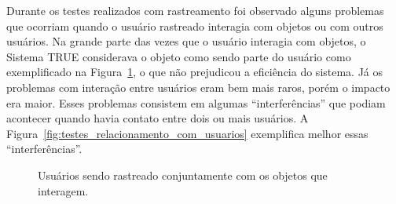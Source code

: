 	Durante os testes realizados com rastreamento foi observado alguns problemas que ocorriam quando o usuário rastreado interagia com objetos ou com outros usuários. Na grande parte das vezes que o usuário interagia com objetos, o Sistema TRUE considerava o objeto como sendo parte do usuário como exemplificado na Figura~\ref{fig:testes_relacionamento_com_objetos}, o que não prejudicou a eficiência do sistema. Já os problemas com interação entre usuários eram bem mais raros, porém o impacto era maior. Esses problemas consistem em algumas ``interferências'' que podiam acontecer quando havia contato entre dois ou mais usuários. A Figura~\ref{fig:testes_relacionamento_com_usuarios} exemplifica melhor essas ``interferências''.
	
		\begin{figure}[htb]
			\begin{center}
			\end{center}
			\caption{Usuários sendo rastreado conjuntamente com os objetos que
			interagem.}
			\label{fig:testes_relacionamento_com_objetos}
		\end{figure}
		
